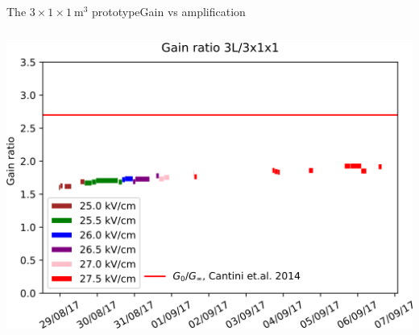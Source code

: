 \documentclass[10pt]{beamer}
\begin{document}
\begin{frame}{The \texorpdfstring{$3 \times 1 \times \SI{1}{\meter\cubed}$}{311} prototype}{Gain vs amplification}
\begin{scriptsize}
\begin{columns}
\begin{column}{0.5\textwidth}
	    			\includegraphics[width=.95\textwidth]{figures/311/ratio_vs_time.png}\\
	    		\end{column}
	    	\end{columns}
    	\end{scriptsize}
    \end{frame}
    
\end{document}
